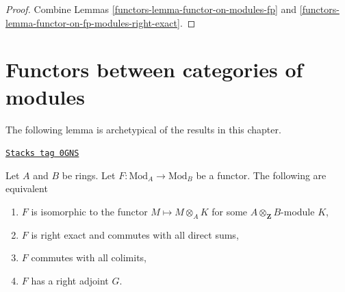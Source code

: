 \begin{proof}

Combine Lemmas \ref{functors-lemma-functor-on-modules-fp} and
\ref{functors-lemma-functor-on-fp-modules-right-exact}.
\end{proof}

\section{Functors between categories of modules}
\label{functors-section-functors}
The following lemma is archetypical of the results in this chapter.

\begin{lemma}[Functor]
\label{functors-lemma-functor}
\href{https://stacks.math.columbia.edu/tag/0GNS}{\texttt{Stacks tag 0GNS}}

Let $A$ and $B$ be rings. Let $F : \text{Mod}_A \to \text{Mod}_B$
be a functor. The following are equivalent
\begin{enumerate}
\item $F$ is isomorphic to the functor $M \mapsto M \otimes_A K$
for some $A \otimes_\mathbf{Z} B$-module $K$,
\item $F$ is right exact and commutes with all direct sums,
\item $F$ commutes with all colimits,
\item $F$ has a right adjoint $G$.
\end{enumerate}
\end{lemma}

